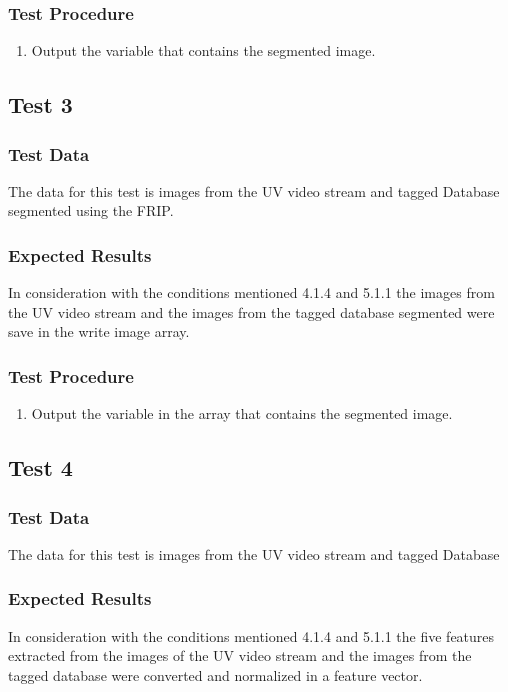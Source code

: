 \documentclass[12pt]{article}
\begin{document}
\subsubsection{Test Procedure}
 \begin{enumerate}
  \item Output the variable that contains the segmented image.
  \end{enumerate}
\subsection{Test 3}
\subsubsection{Test Data}
The data for this test is images from the UV video stream and tagged Database segmented using the FRIP.

\subsubsection{Expected Results}
In consideration with the conditions mentioned 4.1.4 and 5.1.1 the images from the UV video stream and the images from the tagged database segmented were save in the write image array.
\subsubsection{Test Procedure}
\begin{enumerate}
  \item Output the variable in the array that contains the segmented image.
  \end{enumerate}
\subsection{Test 4}
\subsubsection{Test Data}
The data for this test is images from the UV video stream and tagged Database

\subsubsection{Expected Results}
In consideration with the conditions mentioned 4.1.4 and 5.1.1 the five features extracted from the images of the UV video stream and the images from the tagged database were converted and normalized in a feature vector.
\end{document}

